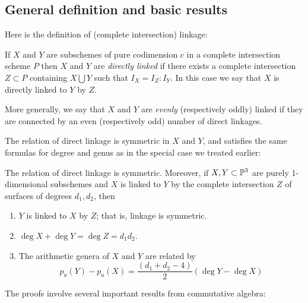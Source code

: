 \subsection{General definition and basic results}

Here is the definition of (complete intersection) linkage:
\begin{definition}
If $X$ and $Y$ are subschemes of pure codimension $c$ in a complete intersection scheme $P$ then $X$ and $Y$ are \emph{directly linked} if there exists a complete intersection $Z \subset P$ containing $X\bigcup Y$ such that $I_{X} = I_{Z}:I_{Y}$. In this case we say that $X$ is directly linked to $Y$ by $Z$. 

More generally, we say that $X$ and $Y$ are \emph{evenly} (respectively oddly) linked if they are
connected by an even (respectively odd) number of direct linkages.\end{definition}

The relation of direct linkage is symmetric in $X$ and $Y$, and satisfies the same formulas for degree and genus as in the special case we treated earlier:

\begin{theorem}\label{justification of general linkage} The relation of direct linkage is symmetric. Moreover, if $X,Y\subset \PP^{3}$ are purely 1-dimensional subschemes and $X$ is linked to $Y$ by the complete intersection $Z$ of surfaces of degrees $d_{1}, d_{2}$, then
\begin{enumerate}
\item $Y$ is linked to $X$ by $Z$; that is, linkage is symmetric.
 \item $\deg X+\deg Y = \deg Z = d_{1}d_{2}$.
 \item  The arithmetic genera of $X$ and $Y$ are related by
$$
p_{a}(Y) - p_{a}(X) =\frac{(d_{1}+d_{2}-4)}{2} (\deg Y - \deg X)
$$
\end{enumerate}
 \end{theorem}
 
 The proofs involve several important results from commutative algebra:
 
